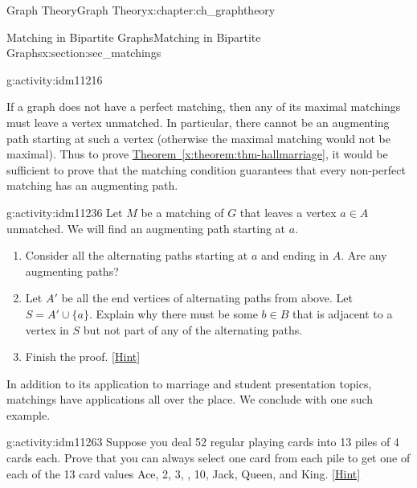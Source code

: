 \documentclass[oneside,10pt,]{book}
\numberwithin{equation}{chapter}
\newcommand{\vtx}[2]{node[fill,circle,inner sep=0pt, minimum size=4pt,label=#1:#2]{}}
\renewcommand{\v}{\vtx{above}{}}
\begin{document}
\begin{chapterptx}{Graph Theory}{}{Graph Theory}{}{}{x:chapter:ch_graphtheory}
\begin{sectionptx}{Matching in Bipartite Graphs}{}{Matching in Bipartite Graphs}{}{}{x:section:sec_matchings}
\begin{activity}{}{g:activity:idm11216}
\begin{enumerate}[font=\bfseries,label=(\alph*),ref=\alph*]
\begin{sidebyside}{1}{0.25}{0.25}{0}
\begin{sbspanel}{0.5}
{
}%
\end{sbspanel}%
\end{sidebyside}%
\end{enumerate}
\end{activity}
If a graph does not have a perfect matching, then any of its maximal matchings must leave a vertex unmatched.  In particular, there cannot be an augmenting path starting at such a vertex (otherwise the maximal matching would not be maximal).  Thus to prove \hyperref[x:theorem:thm-hallmarriage]{Theorem~\ref{x:theorem:thm-hallmarriage}}, it would be sufficient to prove that the matching condition guarantees that every non-perfect matching has an augmenting path.%
\begin{activity}{}{g:activity:idm11236}%
Let \(M\) be a matching of \(G\) that leaves a vertex \(a \in A\) unmatched.  We will find an augmenting path starting at \(a\).%
\begin{enumerate}[font=\bfseries,label=(\alph*),ref=\alph*]
\item{}Consider all the alternating paths starting at \(a\) and ending in \(A\).  Are any augmenting paths?%
\item{}Let \(A'\) be all the end vertices of alternating paths from above.  Let \(S = A' \cup \{a\}\).  Explain why there must be some \(b \in B\) that is adjacent to a vertex in \(S\) but not part of any of the alternating paths.%
\item{}Finish the proof.%
\space\hspace*{0pt}\hfill{\tiny\hyperlink{g:hint:idm11258-back}{[Hint]}}\end{enumerate}
\end{activity}
In addition to its application to marriage and student presentation topics, matchings have applications all over the place. We conclude with one such example.%
\begin{activity}{}{g:activity:idm11263}%
Suppose you deal 52 regular playing cards into 13 piles of 4 cards each. Prove that you can always select one card from each pile to get one of each of the 13 card values Ace, 2, 3, \textellipsis{}, 10, Jack, Queen, and King.%
\space\hspace*{0pt}\hfill{\tiny\hyperlink{g:hint:idm11267-back}{[Hint]}}\end{activity}

\end{sectionptx}
\end{chapterptx}
\end{document}
